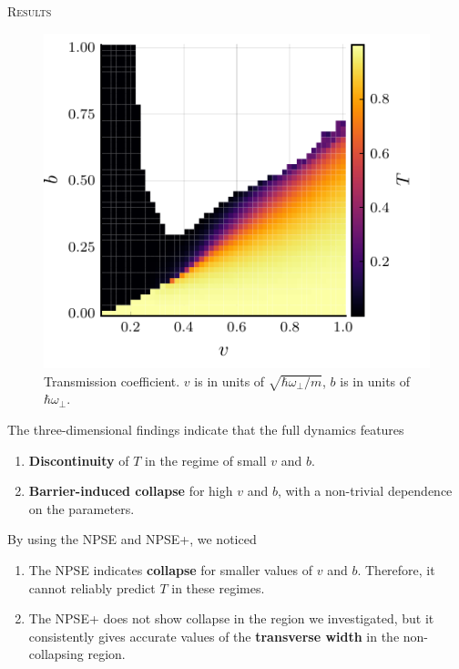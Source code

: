\documentclass[final]{beamer}
\newlength{\colwidth}
\begin{document}
\begin{frame}[t]
\begin{columns}[t]
\begin{column}{\colwidth}
      \begin{block}{\textsc{Results}}
        \begin{figure}
          \centering
          \includegraphics[width=.50\linewidth]{figures/tiles_G3.pdf}%
          \caption{Transmission coefficient. $v$ is in units of $\sqrt{\hbar \omega_\perp / m}$, $b$ is in units of $\hbar \omega_\perp$.}
          \label{fig:heatmap}
        \end{figure}
        The three-dimensional findings indicate that the full dynamics features
        \begin{enumerate}
          \item \textbf{Discontinuity} of $T$ in the regime of small $v$ and $b$. 
          \item \textbf{Barrier-induced collapse} for high $v$ and $b$, with a non-trivial dependence on the parameters.
        \end{enumerate}
        By using the NPSE and NPSE+, we noticed 
        \begin{enumerate}
          \item The NPSE indicates \textbf{collapse} for smaller values of $v$ and $b$. Therefore, it cannot reliably predict $T$ in these regimes.
          \item The NPSE+ does not show collapse in the region we investigated, but it consistently gives accurate values of the \textbf{transverse width} in the non-collapsing region.
        \end{enumerate}
        \vspace{1cm}
        \begin{figure}
\end{figure}
\end{block}
\end{column}
\end{columns}
\end{frame}
\end{document}
